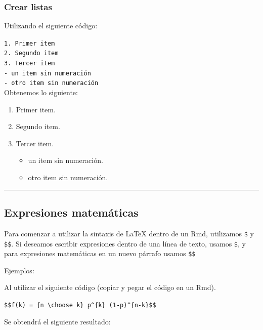 \documentclass[
]{article}
\providecommand{\tightlist}{%
  \setlength{\itemsep}{0pt}\setlength{\parskip}{0pt}}
\begin{document}
\hypertarget{listas}{%
\subsubsection{Crear listas}\label{listas}}

Utilizando el siguiente código:

\texttt{1.\ Primer\ item}~\\
\texttt{2.\ Segundo\ item}~\\
\texttt{3.\ Tercer\ item}~\\
\texttt{-\ un\ item\ sin\ numeración}~\\
\texttt{-\ otro\ item\ sin\ numeración}~\\

Obtenemos lo siguiente:

\begin{enumerate}
\def\labelenumi{\arabic{enumi}.}
\tightlist
\item
  Primer item.
\item
  Segundo item.
\item
  Tercer item.

  \begin{itemize}
  \tightlist
  \item
    un item sin numeración.
  \item
    otro item sin numeración.
  \end{itemize}
\end{enumerate}

\begin{center}\rule{0.5\linewidth}{0.5pt}\end{center}

\hypertarget{expre}{%
\subsection{Expresiones matemáticas}\label{expre}}

Para comenzar a utilizar la sintaxis de LaTeX dentro de un Rmd,
utilizamos \texttt{\$} y \texttt{\$\$}. Si deseamos escribir expresiones
dentro de una línea de texto, usamos \texttt{\$}, y para expresiones
matemáticas en un nuevo párrafo usamos \texttt{\$\$}

Ejemplos:

Al utilizar el siguiente código (copiar y pegar el código en un Rmd).

\texttt{\$\$f(k)\ =\ \{n\ \textbackslash{}choose\ k\}\ p\^{}\{k\}\ (1-p)\^{}\{n-k\}\$\$}

Se obtendrá el siguiente resultado:
\end{document}
